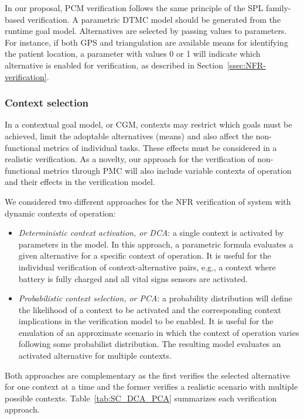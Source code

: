 In our proposal, PCM verification follows the same principle of the SPL family-based verification. A parametric DTMC model should be generated from the runtime goal model. Alternatives are selected by passing values to parameters. For instance, if both GPS and triangulation are available means for identifying the patient location, a parameter with values 0 or 1 will indicate which alternative is enabled for verification, as described in Section~\ref{ssec:NFR-verification}.

\subsubsection{Context selection}

In a contextual goal model, or CGM, contexts may restrict which goals must be achieved, limit the adoptable alternatives (means) and also affect the non-functional metrics of individual tasks. These effects must be considered in a realistic verification. As a novelty, our approach for the verification of non-functional metrics through PMC will also include variable contexts of operation and their effects in the verification model. 

We considered two different approaches for the NFR verification of system with dynamic contexts of operation:

\begin{itemize}

\item \textit{Deterministic context activation, or DCA}: a single context is activated by parameters in the model. In this approach, a parametric formula evaluates a given alternative for a specific context of operation. It is useful for the individual verification of context-alternative pairs, e.g., a context where battery is fully charged and all vital signs sensors are activated.
\medskip

\item \textit{Probabilistic context selection, or PCA}: a probability distribution will define the likelihood of a context to be activated and the corresponding context implications in the verification model to be enabled. It is useful for the emulation of an approximate scenario in which the context of operation varies following some probabilist distribution. The resulting model evaluates an activated alternative for multiple contexts. 

\end{itemize}

Both approaches are complementary as the first verifies the selected alternative for one context at a time and the former verifies a realistic scenario with multiple possible contexts. Table~\ref{tab:SC_DCA_PCA} summarizes each verification approach.

